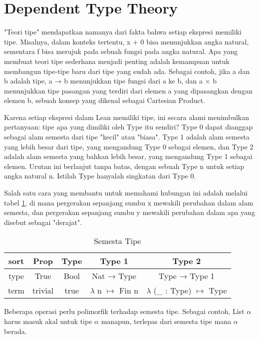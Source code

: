 \section{Dependent Type Theory}

"Teori tipe" mendapatkan namanya dari fakta bahwa setiap ekspresi memiliki tipe. Misalnya, dalam konteks tertentu, x + 0 bisa menunjukkan angka natural, sementara f bisa merujuk pada sebuah fungsi pada angka natural. Apa yang membuat teori tipe sederhana menjadi penting adalah kemampuan untuk membangun tipe-tipe baru dari tipe yang sudah ada. Sebagai contoh, jika a dan b adalah tipe, a → b menunjukkan tipe fungsi dari a ke b, dan a × b menunjukkan tipe pasangan yang terdiri dari elemen a yang dipasangkan dengan elemen b, sebuah konsep yang dikenal sebagai Cartesian Product.

Karena setiap ekspresi dalam Lean memiliki tipe, ini secara alami menimbulkan pertanyaan: tipe apa yang dimiliki oleh Type itu sendiri? Type 0 dapat dianggap sebagai alam semesta dari tipe "kecil" atau "biasa". Type 1 adalah alam semesta yang lebih besar dari tipe, yang mengandung Type 0 sebagai elemen, dan Type 2 adalah alam semesta yang bahkan lebih besar, yang mengandung Type 1 sebagai elemen. Urutan ini berlanjut tanpa batas, dengan sebuah Type n untuk setiap angka natural n. Istilah Type hanyalah singkatan dari Type 0.

Salah satu cara yang membantu untuk memahami hubungan ini adalah melalui tabel \ref{table:type-universe}, di mana pergerakan sepanjang sumbu x mewakili perubahan dalam alam semesta, dan pergerakan sepanjang sumbu y mewakili perubahan dalam apa yang disebut sebagai "derajat".

\begin{table}[H]
    \label{table:type-universe}
    \caption{Semesta Tipe  \citep{Avigad2024}}
    \centering
    \begin{tabular}{|c|c|c|c|c|}
        \hline
        sort & Prop & Type & Type 1 & Type 2 \\
        \hline
        type & True & Bool & Nat → Type & Type → Type 1 \\
        \hline
        term & trivial & true & $\lambda$ n $\mapsto$ Fin n & $\lambda$ (\_ : Type) $\mapsto$ Type \\
        \hline
    \end{tabular}
\end{table}

Beberapa operasi perlu polimorfik terhadap semesta tipe. Sebagai contoh, List $\alpha$ harus masuk akal untuk tipe $\alpha$ manapun, terlepas dari semesta tipe mana $\alpha$ berada.

